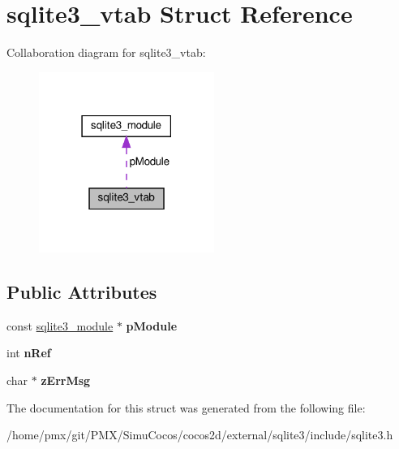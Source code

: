 \hypertarget{structsqlite3__vtab}{}\section{sqlite3\+\_\+vtab Struct Reference}
\label{structsqlite3__vtab}


Collaboration diagram for sqlite3\+\_\+vtab\+:
\nopagebreak
\begin{figure}[H]
\begin{center}
\leavevmode
\includegraphics[width=162pt]{structsqlite3__vtab__coll__graph}
\end{center}
\end{figure}
\subsection*{Public Attributes}
\begin{DoxyCompactItemize}
\item 
\mbox{\label{structsqlite3__vtab_acf0d906e36b113669eaa883c5f8b5ba0}} 
const \hyperlink{structsqlite3__module}{sqlite3\+\_\+module} $\ast$ {\bfseries p\+Module}
\item 
\mbox{\label{structsqlite3__vtab_ab3c80d385849bdd82363a0df7d6fcba8}} 
int {\bfseries n\+Ref}
\item 
\mbox{\label{structsqlite3__vtab_a47331586775d674ae951b07ebb902fca}} 
char $\ast$ {\bfseries z\+Err\+Msg}
\end{DoxyCompactItemize}


The documentation for this struct was generated from the following file\+:\begin{DoxyCompactItemize}
\item 
/home/pmx/git/\+P\+M\+X/\+Simu\+Cocos/cocos2d/external/sqlite3/include/sqlite3.\+h\end{DoxyCompactItemize}
